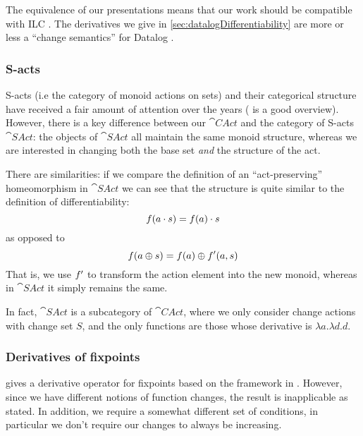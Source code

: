 The equivalence of our presentations means that our work should be compatible
with ILC \autocite[see][section 3]{cai2014changes}. The derivatives we give in \cref{sec:datalogDifferentiability} are more or
less a ``change semantics'' for Datalog \autocite[see][section
3.5]{cai2014changes}. 

\subsubsection{S-acts}
\label{sec:sacts}

S-acts (i.e the category of monoid actions on sets) and their categorical structure have received a fair amount of attention
over the years (\textcite{kilp2000monoids} is a good
overview). However, there is a key difference between our $\cat{CAct}$ and the category of
S-acts $\cat{SAct}$: the objects of $\cat{SAct}$ all maintain the same monoid
structure, whereas we are interested in changing both the base set \emph{and} the structure of the act.

There are similarities: if we compare the definition of an ``act-preserving''
homeomorphism in $\cat{SAct}$ \autocite[see][]{kilp2000monoids} we can see that the structure is
quite similar to the definition of differentiability:
\begin{displaymath}
  f(a \cdot s) = f(a) \cdot s
\end{displaymath}
as opposed to
\begin{displaymath}
  f(a \oplus s) = f(a) \oplus f'(a, s)
\end{displaymath}
That is, we use $f'$ to transform the action element into the new
monoid, whereas in $\cat{SAct}$ it simply remains the same.

In fact, $\cat{SAct}$ is a subcategory of $\cat{CAct}$, where we only
consider change actions with change set $S$, and the only functions are those
whose derivative is $\lambda a. \lambda d. d$.

\subsubsection{Derivatives of fixpoints}

\textcite{arntz2017fixpoints} gives a derivative operator for fixpoints based on
the framework in \textcite{cai2014changes}. However, since we have different
notions of function changes, the result is inapplicable as
stated. In addition, we require a somewhat different set of conditions, in particular we
don't require our changes to always be increasing.

